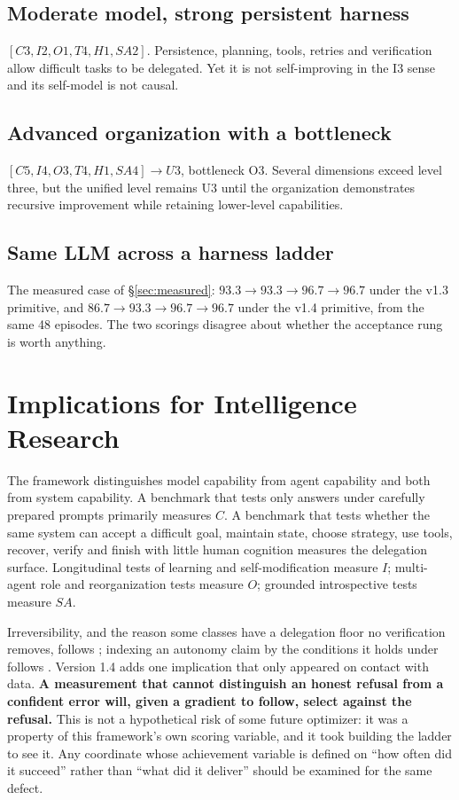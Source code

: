 \documentclass[11pt]{article}
\theoremstyle{definition}
\begin{document}
\subsection{Moderate model, strong persistent harness}
$[C3, I2, O1, T4, H1, SA2]$. Persistence, planning, tools, retries and verification allow difficult tasks to be delegated. Yet it is not self-improving in the I3 sense and its self-model is not causal.

\subsection{Advanced organization with a bottleneck}
$[C5, I4, O3, T4, H1, SA4] \to U3$, bottleneck O3. Several dimensions exceed level three, but the unified level remains U3 until the organization demonstrates recursive improvement while retaining lower-level capabilities.

\subsection{Same LLM across a harness ladder}
The measured case of \S\ref{sec:measured}: $93.3 \to 93.3 \to 96.7 \to 96.7$ under the v1.3 primitive, and $86.7 \to 93.3 \to 96.7 \to 96.7$ under the v1.4 primitive, from the same 48 episodes. The two scorings disagree about whether the acceptance rung is worth anything.

\section{Implications for Intelligence Research}

The framework distinguishes model capability from agent capability and both from system capability. A benchmark that tests only answers under carefully prepared prompts primarily measures $C$. A benchmark that tests whether the same system can accept a difficult goal, maintain state, choose strategy, use tools, recover, verify and finish with little human cognition measures the delegation surface. Longitudinal tests of learning and self-modification measure $I$; multi-agent role and reorganization tests measure $O$; grounded introspective tests measure $SA$.

Irreversibility, and the reason some classes have a delegation floor no verification removes, follows \citet{perrow1984}; indexing an autonomy claim by the conditions it holds under follows \citet{sae2021j3016}. Version 1.4 adds one implication that only appeared on contact with data. \textbf{A measurement that cannot distinguish an honest refusal from a confident error will, given a gradient to follow, select against the refusal.} This is not a hypothetical risk of some future optimizer: it was a property of this framework's own scoring variable, and it took building the ladder to see it. Any coordinate whose achievement variable is defined on ``how often did it succeed'' rather than ``what did it deliver'' should be examined for the same defect.
\end{document}
